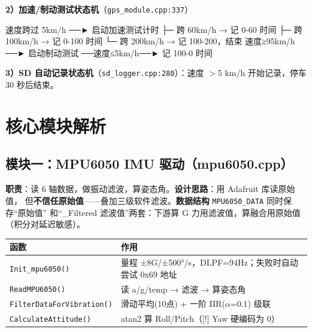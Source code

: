 \documentclass[UTF8,11pt,a4paper]{ctexart}
\begin{document}
\textbf{2）加速/制动测试状态机}（\texttt{gps\_module.cpp:337}）
\begin{ascii}
速度跨过 5km/h ──► 启动加速测试计时
   ├─ 跨 60km/h  → 记 0-60 时间
   ├─ 跨 100km/h → 记 0-100 时间
   └─ 跨 200km/h → 记 100-200，结束
速度≥95km/h ──► 启动制动测试 ──速度≤5km/h──► 记 100-0 时间
\end{ascii}

\textbf{3）SD 自动记录状态机}（\texttt{sd\_logger.cpp:280}）：速度 $>$5 km/h 开始记录，停车 30 秒后结束。

\section{核心模块解析}

\subsection{模块一：MPU6050 IMU 驱动（mpu6050.cpp）}
\textbf{职责}：读 6 轴数据，做振动滤波，算姿态角。\textbf{设计思路}：用 Adafruit 库读原始值，
但\textbf{不信任原始值}——叠加三级软件滤波。\textbf{数据结构} \texttt{MPU6050\_DATA} 同时保存“原始值”
和“\_Filtered 滤波值”两套：下游算 G 力用滤波值，算融合用原始值（积分对延迟敏感）。
\begin{center}\small
\begin{tabularx}{\linewidth}{@{}lX@{}}
\toprule
\textbf{函数} & \textbf{作用} \\
\midrule
\texttt{Init\_mpu6050()} & 量程 ±8G/±500°/s，DLPF=94Hz；失败时自动尝试 0x69 地址 \\
\texttt{ReadMPU6050()} & 读 a/g/temp → 滤波 → 算姿态角 \\
\texttt{FilterDataForVibration()} & 滑动平均(10点) + 一阶 IIR(\(\alpha\)=0.1) 级联 \\
\texttt{CalculateAttitude()} & atan2 算 Roll/Pitch（[!] Yaw 硬编码为 0） \\
\bottomrule
\end{tabularx}
\end{center}
\end{document}
